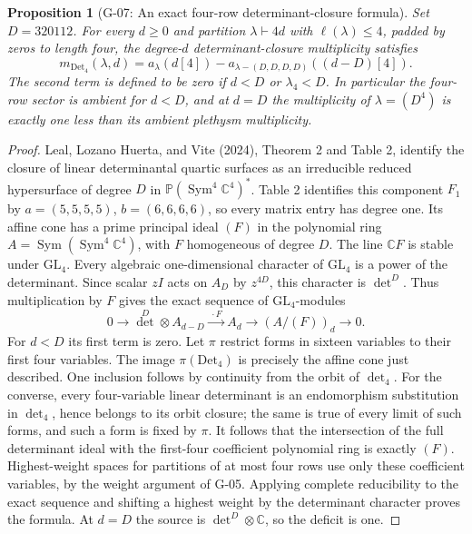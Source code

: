 \documentclass[11pt,a4paper]{article}
\newtheorem{proposition}{Proposition}
\theoremstyle{definition}\newtheorem{definition}{Definition}
\begin{document}
\begin{proposition}[G-07: An exact four-row determinant-closure formula]\label{G-07}
Set $D=320112$. For every $d\geq0$ and partition $\lambda\vdash4d$ with $\ell(\lambda)\leq4$, padded by zeros to length four, the degree-$d$ determinant-closure multiplicity satisfies
\[
 m_{\mathrm{Det}_4}(\lambda,d)
 =a_\lambda(d[4])-a_{\lambda-(D,D,D,D)}((d-D)[4]).
\]
The second term is defined to be zero if $d<D$ or $\lambda_4<D$. In particular the four-row sector is ambient for $d<D$, and at $d=D$ the multiplicity of $\lambda=(D^4)$ is exactly one less than its ambient plethysm multiplicity.
\end{proposition}
\begin{proof}
Leal, Lozano Huerta, and Vite (2024), Theorem 2 and Table 2, identify the closure of linear determinantal quartic surfaces as an irreducible reduced hypersurface of degree $D$ in $\mathbb P(\operatorname{Sym}^4\mathbb C^4)^*$. Table 2 identifies this component $F_1$ by $a=(5,5,5,5)$, $b=(6,6,6,6)$, so every matrix entry has degree one. Its affine cone has a prime principal ideal $(F)$ in the polynomial ring $A=\operatorname{Sym}(\operatorname{Sym}^4\mathbb C^4)$, with $F$ homogeneous of degree $D$.
The line $\mathbb CF$ is stable under $\mathrm{GL}_4$. Every algebraic one-dimensional character of $\mathrm{GL}_4$ is a power of the determinant. Since scalar $zI$ acts on $A_D$ by $z^{4D}$, this character is $\det^D$. Thus multiplication by $F$ gives the exact sequence of $\mathrm{GL}_4$-modules
\[
 0\longrightarrow \det^D\otimes A_{d-D}\xrightarrow{\ \cdot F\ }A_d
 \longrightarrow(A/(F))_d\longrightarrow0.
\]
For $d<D$ its first term is zero.
Let $\pi$ restrict forms in sixteen variables to their first four variables. The image $\pi(\mathrm{Det}_4)$ is precisely the affine cone just described. One inclusion follows by continuity from the orbit of $\det_4$. For the converse, every four-variable linear determinant is an endomorphism substitution in $\det_4$, hence belongs to its orbit closure; the same is true of every limit of such forms, and such a form is fixed by $\pi$. It follows that the intersection of the full determinant ideal with the first-four coefficient polynomial ring is exactly $(F)$. Highest-weight spaces for partitions of at most four rows use only these coefficient variables, by the weight argument of G-05. Applying complete reducibility to the exact sequence and shifting a highest weight by the determinant character proves the formula. At $d=D$ the source is $\det^D\otimes\mathbb C$, so the deficit is one.
\end{proof}
\end{document}
